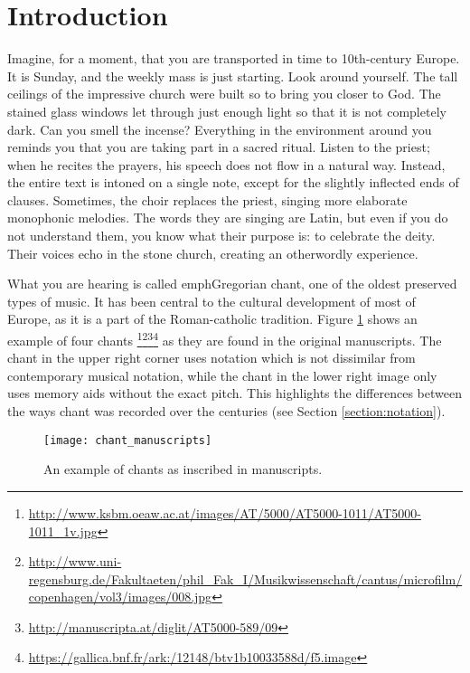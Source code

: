 \chapter*{Introduction}

Imagine, for a moment, that you are transported in time to 10th-century Europe. It is Sunday, and the weekly mass is just
starting. Look around yourself. The tall ceilings of the impressive church were built so to bring you closer to God. The stained glass windows
let through just enough light so that it is not completely dark. Can you smell the incense? Everything in the environment around
you reminds you that you are taking part in a sacred ritual. Listen to the priest; when he recites the prayers, his speech does not 
flow in a natural way. Instead, the entire text is intoned on a single note, except for the slightly inflected ends of clauses. 
Sometimes, the choir replaces the priest, singing more elaborate monophonic melodies. The words they are singing are Latin, but even 
if you do not understand them, you know what their purpose is: to celebrate the deity. Their voices echo in the stone church, creating an
otherwordly experience.

What you are hearing is called emph{Gregorian chant}, one of the oldest preserved types of music. It has been central to the cultural development
of most of Europe, as it is a part of the Roman-catholic tradition. Figure \ref{fig:chant_manuscripts} shows an example of four chants
\footnote{\url{http://www.ksbm.oeaw.ac.at/images/AT/5000/AT5000-1011/AT5000-1011\_1v.jpg}}\footnote{\url{http://www.uni-regensburg.de/Fakultaeten/phil\_Fak\_I/Musikwissenschaft/cantus/microfilm/copenhagen/vol3/images/008.jpg}}\footnote{\url{http://manuscripta.at/diglit/AT5000-589/09}}\footnote{\url{https://gallica.bnf.fr/ark:/12148/btv1b10033588d/f5.image}} as they are found in
the original manuscripts. The chant in the upper right corner uses notation which is not dissimilar from contemporary musical notation,
while the chant in the lower right image only uses memory aids without the exact pitch. This highlights the differences
between the ways chant was recorded over the centuries (see Section \ref{section:notation}).

\begin{figure}[h]
\centering
\texttt{[image: chant\_manuscripts]}
\caption{An example of chants as inscribed in manuscripts.}
\label{fig:chant_manuscripts}
\end{figure}

